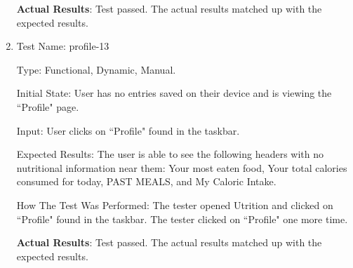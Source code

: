 \documentclass[12pt, titlepage]{article}
\begin{document}
\begin{enumerate}
		\textbf{Actual Results}: Test passed. The actual results matched up with the expected results.
		
		\item{Test Name: profile-13}
		
		Type: Functional, Dynamic, Manual.
		
		Initial State: User has no entries saved on their device and is viewing the ``Profile" page.
		
		Input: User clicks on ``Profile" found in the taskbar.
		
		Expected Results: The user is able to see the following headers with no nutritional information near them: Your most eaten food, Your total calories consumed for today, PAST MEALS, and My Caloric Intake.
		
		How The Test Was Performed: The tester opened Utrition and clicked on ``Profile" found in the taskbar. The tester clicked on ``Profile" one more time.
		
		\textbf{Actual Results}: Test passed. The actual results matched up with the expected results.

	\end{enumerate}
\end{document}
